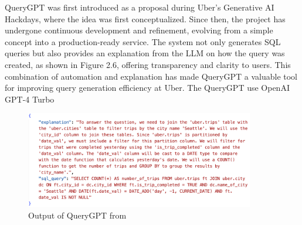     QueryGPT was first introduced as a proposal during Uber's Generative AI Hackdays, where the idea was first conceptualized. Since then, the project has undergone continuous development and refinement, evolving from a simple concept into a production-ready service. The system not only generates SQL queries but also provides an explanation from the LLM on how the query was created, as shown in Figure 2.6, offering transparency and clarity to users. This combination of automation and explanation has made QueryGPT a valuable tool for improving query generation efficiency at Uber. The QueryGPT use OpenAI GPT-4 Turbo
    \cite{QueryGPT}
    \begin{figure}[H]
        \centering
        \includegraphics[width=10cm]{chapters/2/figures/query-gpt-output.png}
        \caption[Output of QueryGPT]{Output of QueryGPT  from~\cite{QueryGPT}}
        \label{fig:query-gpt-output}
    \end{figure}
